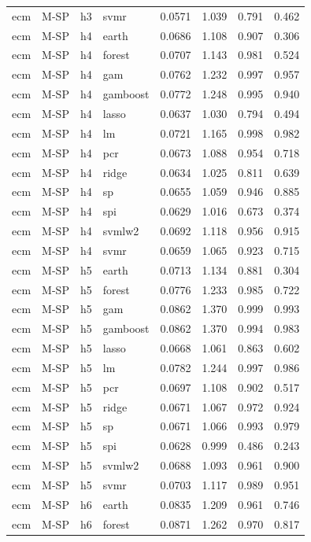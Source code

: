 \begin{ThreePartTable}
\begin{longtable}[t]{llclcccc}
ecm & M-SP & h3 & svmr & 0.0571 & 1.039 & 0.791 & 0.462\\
\addlinespace
ecm & M-SP & h4 & earth & 0.0686 & 1.108 & 0.907 & 0.306\\
ecm & M-SP & h4 & forest & 0.0707 & 1.143 & 0.981 & 0.524\\
ecm & M-SP & h4 & gam & 0.0762 & 1.232 & 0.997 & 0.957\\
ecm & M-SP & h4 & gamboost & 0.0772 & 1.248 & 0.995 & 0.940\\
ecm & M-SP & h4 & lasso & 0.0637 & 1.030 & 0.794 & 0.494\\
ecm & M-SP & h4 & lm & 0.0721 & 1.165 & 0.998 & 0.982\\
ecm & M-SP & h4 & pcr & 0.0673 & 1.088 & 0.954 & 0.718\\
ecm & M-SP & h4 & ridge & 0.0634 & 1.025 & 0.811 & 0.639\\
ecm & M-SP & h4 & sp & 0.0655 & 1.059 & 0.946 & 0.885\\
ecm & M-SP & h4 & spi & 0.0629 & 1.016 & 0.673 & 0.374\\
ecm & M-SP & h4 & svmlw2 & 0.0692 & 1.118 & 0.956 & 0.915\\
ecm & M-SP & h4 & svmr & 0.0659 & 1.065 & 0.923 & 0.715\\
\addlinespace
ecm & M-SP & h5 & earth & 0.0713 & 1.134 & 0.881 & 0.304\\
ecm & M-SP & h5 & forest & 0.0776 & 1.233 & 0.985 & 0.722\\
ecm & M-SP & h5 & gam & 0.0862 & 1.370 & 0.999 & 0.993\\
ecm & M-SP & h5 & gamboost & 0.0862 & 1.370 & 0.994 & 0.983\\
ecm & M-SP & h5 & lasso & 0.0668 & 1.061 & 0.863 & 0.602\\
ecm & M-SP & h5 & lm & 0.0782 & 1.244 & 0.997 & 0.986\\
ecm & M-SP & h5 & pcr & 0.0697 & 1.108 & 0.902 & 0.517\\
ecm & M-SP & h5 & ridge & 0.0671 & 1.067 & 0.972 & 0.924\\
ecm & M-SP & h5 & sp & 0.0671 & 1.066 & 0.993 & 0.979\\
ecm & M-SP & h5 & spi & 0.0628 & 0.999 & 0.486 & 0.243\\
ecm & M-SP & h5 & svmlw2 & 0.0688 & 1.093 & 0.961 & 0.900\\
ecm & M-SP & h5 & svmr & 0.0703 & 1.117 & 0.989 & 0.951\\
\addlinespace
ecm & M-SP & h6 & earth & 0.0835 & 1.209 & 0.961 & 0.746\\
ecm & M-SP & h6 & forest & 0.0871 & 1.262 & 0.970 & 0.817\\

\end{longtable}
\end{ThreePartTable}

